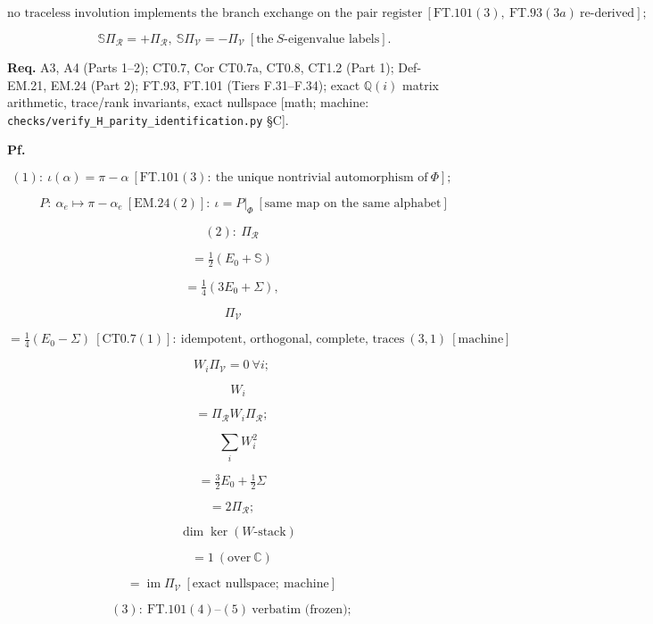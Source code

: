 \begin{theorem}
\[
\text{no traceless involution implements the branch exchange on the pair register}\ [\mathrm{FT.101}(3),\ \mathrm{FT.93}(3a)\ \text{re-derived}];
\]

\[
\qquad \mathbb S\Pi_{\mathcal R}=+\Pi_{\mathcal R},\ \mathbb S\Pi_{\mathcal V}=-\Pi_{\mathcal V}\ [\text{the}\ S\text{-eigenvalue labels}].
\]

\textbf{Req.} A3, A4 (Parts 1–2); CT0.7, Cor CT0.7a, CT0.8, CT1.2 (Part 1); Def-EM.21, EM.24 (Part 2); FT.93, FT.101 (Tiers F.31–F.34); exact $\mathbb Q(i)$ matrix arithmetic, trace/rank invariants, exact nullspace [math; machine: \texttt{checks/\allowbreak{}verify\_\allowbreak{}H\_\allowbreak{}parity\_\allowbreak{}identification.py} §C].

\textbf{Pf.}

\[
(1):\ \iota(\alpha)=\pi-\alpha\ [\mathrm{FT.101}(3):\ \text{the unique nontrivial automorphism of}\ \Phi];
\]

\[
\qquad P:\ \alpha_e\mapsto\pi-\alpha_e\ [\mathrm{EM.24}(2)]:\ \iota=P|_{\Phi}\ [\text{same map on the same alphabet}]
\]

\[
(2):\ \Pi_{\mathcal R}
\]

\[
= \tfrac12(E_0+\mathbb S)
\]

\[
= \tfrac14(3E_0+\Sigma),
\]

\[
\ \Pi_{\mathcal V}
\]

\[
= \tfrac14(E_0-\Sigma)\ [\mathrm{CT0.7}(1)]:\ \text{idempotent, orthogonal, complete, traces}\ (3,1)\ [\text{machine}]
\]

\[
W_i\Pi_{\mathcal V}=0\ \forall i;
\]

\[
\quad W_i
\]

\[
= \Pi_{\mathcal R}W_i\Pi_{\mathcal R};
\]

\[
\quad\textstyle\sum_iW_i^2
\]

\[
= \tfrac32E_0+\tfrac12\Sigma
\]

\[
= 2\Pi_{\mathcal R};
\]

\[
\quad\dim\ker(W\text{-stack})
\]

\[
= 1\ (\text{over}\ \mathbb C)
\]

\[
= \operatorname{im}\Pi_{\mathcal V}\ [\text{exact nullspace};\ \text{machine}]
\]

\[
(3):\ \mathrm{FT.101}(4)\text{–}(5)\ \text{verbatim (frozen)};
\]


\end{theorem}
